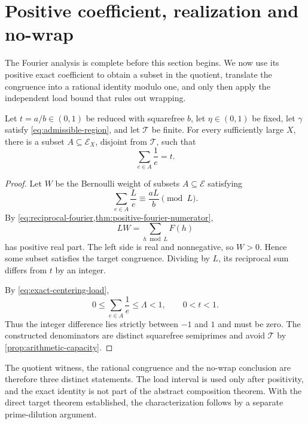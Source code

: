 \section{Positive coefficient, realization and no-wrap}
\label{sec:positive-realization}

The Fourier analysis is complete before this section begins.  We now use its positive exact coefficient to obtain a subset in the quotient, translate the congruence into a rational identity modulo one, and only then apply the independent load bound that rules out wrapping.

\begin{theorem}
\label{thm:avoiding-fixed-target}
Let $t=a/b\in(0,1)$ be reduced with squarefree $b$, let $\eta\in(0,1)$ be fixed, let $\gamma$ satisfy \cref{eq:admissible-region}, and let $\mathcal T$ be finite.  For every sufficiently large $X$, there is a subset $A\subseteq\mathcal E_X$, disjoint from $\mathcal T$, such that
\[
 \sum_{e\in A}\frac1e=t.
\]
\end{theorem}

\begin{proof}
Let $W$ be the Bernoulli weight of subsets $A\subseteq\mathcal E$ satisfying
\[
 \sum_{e\in A}\frac{L}{e}\equiv\frac{aL}{b}\pmod L.
\]
By \cref{eq:reciprocal-fourier,thm:positive-fourier-numerator},
\[
 LW=\sum_{h\bmod L}F(h)
\]
has positive real part.  The left side is real and nonnegative, so $W>0$.  Hence some subset satisfies the target congruence.  Dividing by $L$, its reciprocal sum differs from $t$ by an integer.

By \cref{eq:exact-centering-load},
\[
 0\leq\sum_{e\in A}\frac1e\leq\Lambda<1,
 \qquad
 0<t<1.
\]
Thus the integer difference lies strictly between $-1$ and $1$ and must be zero.  The constructed denominators are distinct squarefree semiprimes and avoid $\mathcal T$ by \cref{prop:arithmetic-capacity}.
\end{proof}

The quotient witness, the rational congruence and the no-wrap conclusion are therefore three distinct statements.  The load interval is used only after positivity, and the exact identity is not part of the abstract composition theorem.  With the direct target theorem established, the characterization follows by a separate prime-dilution argument.
